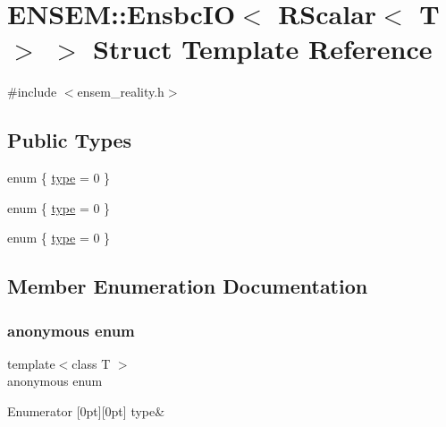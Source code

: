 \hypertarget{structENSEM_1_1EnsbcIO_3_01RScalar_3_01T_01_4_01_4}{}\section{E\+N\+S\+EM\+:\+:Ensbc\+IO$<$ R\+Scalar$<$ T $>$ $>$ Struct Template Reference}
\label{structENSEM_1_1EnsbcIO_3_01RScalar_3_01T_01_4_01_4}


{\ttfamily \#include $<$ensem\+\_\+reality.\+h$>$}

\subsection*{Public Types}
\begin{DoxyCompactItemize}
\item 
enum \{ \mbox{\hyperlink{structENSEM_1_1EnsbcIO_3_01RScalar_3_01T_01_4_01_4_a5880ee6fb3303abec2df1a781f154621a2700b782b422b58c4855d989a57b71c1}{type}} = 0
 \}
\item 
enum \{ \mbox{\hyperlink{structENSEM_1_1EnsbcIO_3_01RScalar_3_01T_01_4_01_4_a5880ee6fb3303abec2df1a781f154621a2700b782b422b58c4855d989a57b71c1}{type}} = 0
 \}
\item 
enum \{ \mbox{\hyperlink{structENSEM_1_1EnsbcIO_3_01RScalar_3_01T_01_4_01_4_a5880ee6fb3303abec2df1a781f154621a2700b782b422b58c4855d989a57b71c1}{type}} = 0
 \}
\end{DoxyCompactItemize}


\subsection{Member Enumeration Documentation}
\mbox{\label{structENSEM_1_1EnsbcIO_3_01RScalar_3_01T_01_4_01_4_a0f412d1ee6452284f67577ed452dc8d8}} 
\subsubsection{\texorpdfstring{anonymous enum}{anonymous enum}}
{\footnotesize\ttfamily template$<$class T $>$ \\
anonymous enum}

\begin{DoxyEnumFields}{Enumerator}
[0pt][0pt]{}\mbox{\label{structENSEM_1_1EnsbcIO_3_01RScalar_3_01T_01_4_01_4_a5880ee6fb3303abec2df1a781f154621a2700b782b422b58c4855d989a57b71c1}} 
type&\\
\hline

\end{DoxyEnumFields}
\mbox{\label{structENSEM_1_1EnsbcIO_3_01RScalar_3_01T_01_4_01_4_a80a7eb0f4934e63322b9846e86bb98f7}} 
